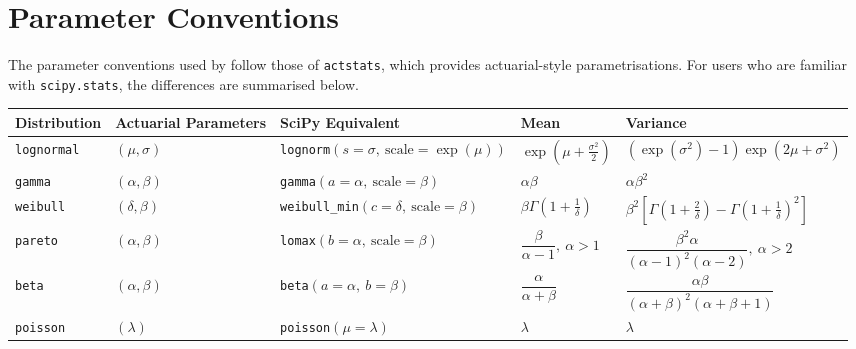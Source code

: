 \section{Parameter Conventions}
\label{app:parameter_conventions}

The parameter conventions used by \actsim follow those of
\texttt{actstats}, which provides actuarial-style parametrisations.
For users who are familiar with \texttt{scipy.stats}, the differences 
are summarised below.

\begin{longtable}[htbp]
  \centering
  \small
  \renewcommand{\arraystretch}{1.25}
  \begin{tabularx}{\textwidth}{llllX}
  \toprule
  \textbf{Distribution} 
  & \textbf{Actuarial Parameters} 
  & \textbf{SciPy Equivalent} 
  & \textbf{Mean} 
  & \textbf{Variance} \\
  \midrule
  
  \texttt{lognormal} 
  & $(\mu, \sigma)$ 
  & \texttt{lognorm}$(s=\sigma,\ \text{scale}=\exp(\mu))$ 
  & $\exp\left(\mu + \frac{\sigma^2}{2}\right)$ 
  & $\left(\exp(\sigma^2)-1\right)\exp\left(2\mu+\sigma^2\right)$ \\
  
  \texttt{gamma} 
  & $(\alpha, \beta)$ 
  & \texttt{gamma}$(a=\alpha,\ \text{scale}=\beta)$ 
  & $\alpha\beta$ 
  & $\alpha\beta^2$ \\
  
  \texttt{weibull} 
  & $(\delta, \beta)$ 
  & \texttt{weibull\_min}$(c=\delta,\ \text{scale}=\beta)$ 
  & $\beta\Gamma\left(1+\frac{1}{\delta}\right)$ 
  & $\beta^2\left[\Gamma\left(1+\frac{2}{\delta}\right)
  - \Gamma\left(1+\frac{1}{\delta}\right)^2\right]$ \\
  
  \texttt{pareto} 
  & $(\alpha, \beta)$ 
  & \texttt{lomax}$(b=\alpha,\ \text{scale}=\beta)$ 
  & $\dfrac{\beta}{\alpha-1},\ \alpha>1$ 
  & $\dfrac{\beta^2\alpha}{(\alpha-1)^2(\alpha-2)},\ \alpha>2$ \\
  
  \texttt{beta} 
  & $(\alpha, \beta)$ 
  & \texttt{beta}$(a=\alpha,\ b=\beta)$ 
  & $\dfrac{\alpha}{\alpha+\beta}$ 
  & $\dfrac{\alpha\beta}{(\alpha+\beta)^2(\alpha+\beta+1)}$ \\
  
  \texttt{poisson} 
  & $(\lambda)$ 
  & \texttt{poisson}$(\mu=\lambda)$ 
  & $\lambda$ 
  & $\lambda$ \\
  

\end{tabularx}
\end{longtable}
